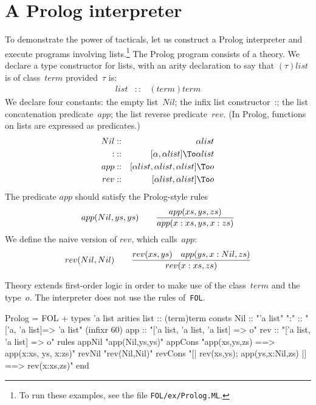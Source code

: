 \section{A Prolog interpreter}
To demonstrate the power of tacticals, let us construct a Prolog
interpreter and execute programs involving lists.\footnote{To run these
examples, see the file {\tt FOL/ex/Prolog.ML}.} The Prolog program
consists of a theory.  We declare a type constructor for lists, with an
arity declaration to say that $(\tau)list$ is of class~$term$
provided~$\tau$ is:
\begin{eqnarray*}
  list  & :: & (term)term
\end{eqnarray*}
We declare four constants: the empty list~$Nil$; the infix list
constructor~{:}; the list concatenation predicate~$app$; the list reverse
predicate~$rev$.  (In Prolog, functions on lists are expressed as
predicates.)
\begin{eqnarray*}
    Nil         & :: & \alpha list \\
    {:}         & :: & [\alpha,\alpha list] \To \alpha list \\
    app & :: & [\alpha list,\alpha list,\alpha list] \To o \\
    rev & :: & [\alpha list,\alpha list] \To o 
\end{eqnarray*}
The predicate $app$ should satisfy the Prolog-style rules
\[ {app(Nil,ys,ys)} \qquad
   {app(xs,ys,zs) \over app(x:xs, ys, x:zs)} \]
We define the naive version of $rev$, which calls~$app$:
\[ {rev(Nil,Nil)} \qquad
   {rev(xs,ys)\quad  app(ys, x:Nil, zs) \over
    rev(x:xs, zs)} 
\]

Theory  extends first-order logic in order to make use
of the class~$term$ and the type~$o$.  The interpreter does not use the
rules of~{\tt FOL}.
\begin{ttbox}
Prolog = FOL +
types   'a list
arities list    :: (term)term
consts  Nil     :: "'a list"
        ":"     :: "['a, 'a list]=> 'a list"            (infixr 60)
        app     :: "['a list, 'a list, 'a list] => o"
        rev     :: "['a list, 'a list] => o"
rules   appNil  "app(Nil,ys,ys)"
        appCons "app(xs,ys,zs) ==> app(x:xs, ys, x:zs)"
        revNil  "rev(Nil,Nil)"
        revCons "[| rev(xs,ys); app(ys,x:Nil,zs) |] ==> rev(x:xs,zs)"
end
\end{ttbox}
